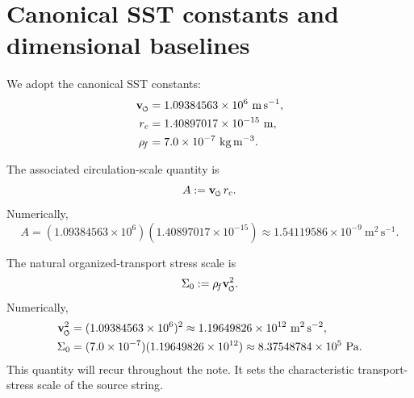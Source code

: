 \documentclass[11pt]{article}
\newcommand{\swirlarrow}{\mathchoice{\mkern-2mu\scriptstyle\boldsymbol{\circlearrowleft}}{\mkern-2mu\scriptstyle\boldsymbol{\circlearrowleft}}{\mkern-2mu\scriptscriptstyle\boldsymbol{\circlearrowleft}}{\mkern-2mu\scriptscriptstyle\boldsymbol{\circlearrowleft}}}
\newcommand{\vswirl}{\mathbf{v}_{\swirlarrow}}
\newcommand{\rhoF}{\rho_{\!f}}
\newcommand{\rc}{r_c}
\begin{document}
        \section{Canonical SST constants and dimensional baselines}
            
            We adopt the canonical SST constants:
            \begin{align}
                \vswirl &= 1.09384563\times 10^6\ \mathrm{m\,s^{-1}},
                \label{eq:const-vswirl}
                \\
                \rc &= 1.40897017\times 10^{-15}\ \mathrm{m},
                \label{eq:const-rc}
                \\
                \rhoF &= 7.0\times 10^{-7}\ \mathrm{kg\,m^{-3}}.
                \label{eq:const-rhof}
            \end{align}
            
            The associated circulation-scale quantity is
            \begin{equation}
                A := \vswirl\,\rc.
                \label{eq:def-A}
            \end{equation}
            Numerically,
            \begin{equation}
                A
                =
                (1.09384563\times 10^6)(1.40897017\times 10^{-15})
                \approx
                1.54119586\times 10^{-9}\ \mathrm{m^2\,s^{-1}}.
                \label{eq:A-numeric}
            \end{equation}
            
            The natural organized-transport stress scale is
            \begin{equation}
                \Sigma_0 := \rhoF \vswirl^2.
                \label{eq:def-Sigma0}
            \end{equation}
            Numerically,
            \begin{align}
                \vswirl^2
                &=
                (1.09384563\times 10^6)^2
                \approx
                1.19649826\times 10^{12}\ \mathrm{m^2\,s^{-2}},
                \\
                \Sigma_0
                &=
                (7.0\times 10^{-7})(1.19649826\times 10^{12})
                \approx
                8.37548784\times 10^5\ \mathrm{Pa}.
                \label{eq:Sigma0-numeric}
            \end{align}
            This quantity will recur throughout the note. It sets the characteristic transport-stress scale of the source string.
        
\end{document}
